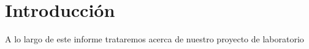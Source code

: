 \documentclass[../portafolio.tex]{subfiles}
\begin{document}

\chapter*{Introducción}

A lo largo de este informe trataremos acerca de nuestro proyecto de laboratorio
\end{document}
